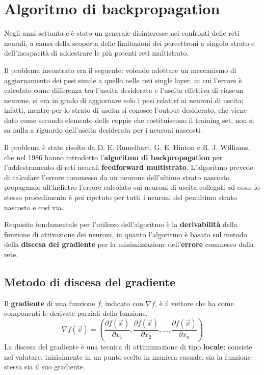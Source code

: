 
\chapter{Algoritmo di backpropagation}
\label{cha:algoritmo_di_back_propagation}

Negli anni settanta c'è stato un generale disinteresse nei confronti delle reti neurali, a causa della scoperta delle limitazioni dei percettroni a singolo strato e dell'incapacità di addestrare le più potenti reti multistrato.

Il problema incontrato era il seguente: volendo adottare un meccanismo di aggiornamento dei pesi simile a quello nelle reti single layer, in cui l'errore è calcolato come differenza tra l'uscita desiderata e l'uscita effettiva di ciascun neurone, si era in grado di aggiornare solo i pesi relativi ai neuroni di uscita; infatti, mentre per lo strato di uscita si conosce l'output desiderato, che viene dato come secondo elemento delle coppie che costituiscono il training set, non si sa nulla a riguardo dell'uscita desiderata per i neuroni nascosti.

Il problema è stato risolto da D. E. Rumelhart, G. E. Hinton e R. J. Williams, che nel 1986 hanno introdotto l'\textbf{algoritmo di backpropagation} per  l'addestramento di reti neurali \textbf{feedforward multistrato}. L'algoritmo prevede di calcolare l'errore commesso da un neurone dell'ultimo strato nascosto propagando all'indietro l'errore calcolato sui neuroni di uscita collegati ad esso; lo stesso procedimento è poi ripetuto per tutti i neuroni del penultimo strato nascosto e così via.

Requisito fondamentale per l'utilizzo dell'algoritmo è la \textbf{derivabilità} della funzione di attivazione dei neuroni, in quanto l'algoritmo è basato sul metodo della \textbf{discesa del gradiente} per la minimizzazione dell'\textbf{errore} commesso dalla rete.

\section{Metodo di discesa del gradiente}
\label{sec:metodo_di_discesa_del_gradiente}

Il \textbf{gradiente} di una funzione $f$, indicato con $\nabla f$, è il vettore che ha come componenti le derivate parziali della funzione.
\begin{displaymath}
	\nabla f(\vec{x}) = \left( \frac{\partial f(\vec{x})}{\partial x_1}, \frac{\partial f(\vec{x})}{\partial x_2}, \dots, \frac{\partial f(\vec{x})}{\partial x_n} \right)
\end{displaymath}
La discesa del gradiente è una tecnica di ottimizzazione di tipo \textbf{locale}: consiste nel valutare, inizialmente in un punto scelto in maniera casuale, sia la funzione stessa sia il suo gradiente.

